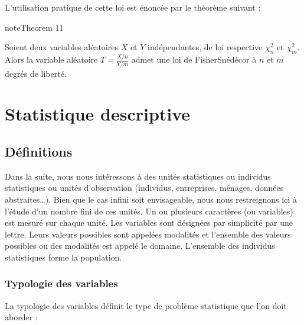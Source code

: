 \documentclass[letterpaper,10pt,english]{jupyterBook}
\begin{document}
\sphinxAtStartPar
L’utilisation pratique de cette loi est énoncée par le théorème suivant :
\label{elemstats:theorem-17}
\begin{sphinxadmonition}{note}{Theorem 11}



\sphinxAtStartPar
Soient deux variables aléatoires \(X\) et \(Y\) indépendantes, de loi respective \(\chi_n^2\) et \(\chi_m^2\). Alors la variable aléatoire \(T=\frac{X/n}{Y/m}\) admet une loi de Fisher\sphinxhyphen{}Snédécor à \(n\) et \(m\) degrés de liberté.
\end{sphinxadmonition}

\sphinxstepscope


\chapter{Statistique descriptive}
\label{\detokenize{statsdescriptives:statistique-descriptive}}\label{\detokenize{statsdescriptives::doc}}

\section{Définitions}
\label{\detokenize{statsdescriptives:definitions}}
\sphinxAtStartPar
Dans la suite, nous nous intéressons à des unités statistiques ou individus statistiques ou unités d’observation (individus,  entreprises,  ménages, données abstraites…). Bien que le cas infini soit envisageable, nous nous restreignons ici à l’étude d’un nombre fini de ces unités. Un ou plusieurs caractères (ou variables) est mesuré sur chaque unité. Les variables sont désignées par simplicité par une lettre. Leurs valeurs possibles sont appelées modalités et l’ensemble des valeurs possibles ou des modalités est appelé le domaine. L’ensemble des individus statistiques forme la population.


\subsection{Typologie des variables}
\label{\detokenize{statsdescriptives:typologie-des-variables}}
\sphinxAtStartPar
La typologie des variables définit le type de problème statistique que l’on doit aborder :
\end{document}
